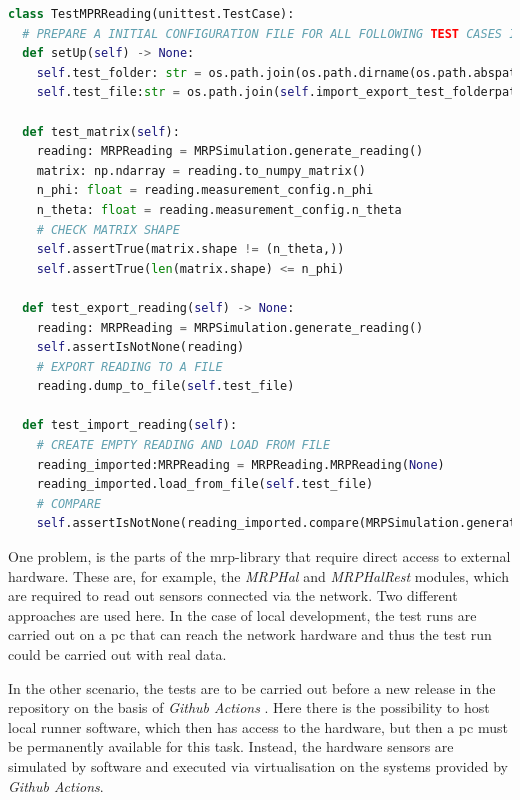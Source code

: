 \begin{lstlisting}[language=Python, caption={Example pytest class for testing MRPReading module functions}, label=lst:pytest_example_code]
class TestMPRReading(unittest.TestCase):
  # PREPARE A INITIAL CONFIGURATION FILE FOR ALL FOLLOWING TEST CASES IN THIS FILE
  def setUp(self) -> None:
    self.test_folder: str = os.path.join(os.path.dirname(os.path.abspath(__file__)), "tmp")
    self.test_file:str = os.path.join(self.import_export_test_folderpath, "tmp")

  def test_matrix(self):
    reading: MRPReading = MRPSimulation.generate_reading()
    matrix: np.ndarray = reading.to_numpy_matrix()
    n_phi: float = reading.measurement_config.n_phi
    n_theta: float = reading.measurement_config.n_theta
    # CHECK MATRIX SHAPE
    self.assertTrue(matrix.shape != (n_theta,))
    self.assertTrue(len(matrix.shape) <= n_phi)

  def test_export_reading(self) -> None:
    reading: MRPReading = MRPSimulation.generate_reading()
    self.assertIsNotNone(reading)
    # EXPORT READING TO A FILE
    reading.dump_to_file(self.test_file)

  def test_import_reading(self):
    # CREATE EMPTY READING AND LOAD FROM FILE
    reading_imported:MRPReading = MRPReading.MRPReading(None)
    reading_imported.load_from_file(self.test_file)
    # COMPARE
    self.assertIsNotNone(reading_imported.compare(MRPSimulation.generate_reading()))
\end{lstlisting}

One problem, is the parts of the \gls{mrp}-library that require direct
access to external hardware. These are, for example, the \emph{MRPHal}
and \emph{MRPHalRest} modules, which are required to read out sensors
connected via the network. Two different approaches are used here. In
the case of local development, the test runs are carried out on a
\gls{pc} that can reach the network hardware and thus the test run could
be carried out with real data.

\newpage

In the other scenario, the tests are to be carried out before a new
release in the repository on the basis of \emph{Github Actions}
\cite{GithubActions}. Here there is the possibility to host local
runner software, which then has access to the hardware, but then a
\gls{pc} must be permanently available for this task. Instead, the
hardware sensors are simulated by software and executed via
virtualisation on the systems provided by \emph{Github Actions}.

